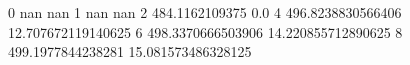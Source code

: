 0 nan nan
1 nan nan
2 484.1162109375 0.0
4 496.8238830566406 12.707672119140625
6 498.3370666503906 14.220855712890625
8 499.1977844238281 15.081573486328125
